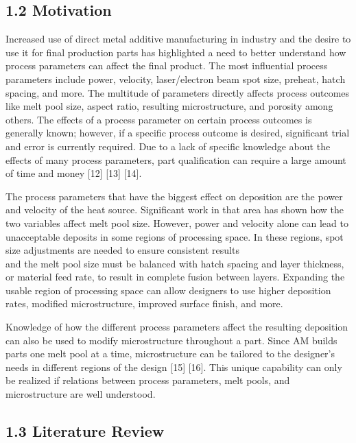 \documentclass[10pt]{article}
\begin{document}
\subsection*{1.2 Motivation}
Increased use of direct metal additive manufacturing in industry and the desire to use it for final production parts has highlighted a need to better understand how process parameters can affect the final product. The most influential process parameters include power, velocity, laser/electron beam spot size, preheat, hatch spacing, and more. The multitude of parameters directly affects process outcomes like melt pool size, aspect ratio, resulting microstructure, and porosity among others. The effects of a process parameter on certain process outcomes is generally known; however, if a specific process outcome is desired, significant trial and error is currently required. Due to a lack of specific knowledge about the effects of many process parameters, part qualification can require a large amount of time and money [12] [13] [14].

The process parameters that have the biggest effect on deposition are the power and velocity of the heat source. Significant work in that area has shown how the two variables affect melt pool size. However, power and velocity alone can lead to unacceptable deposits in some regions of processing space. In these regions, spot size adjustments are needed to ensure consistent results\\
and the melt pool size must be balanced with hatch spacing and layer thickness, or material feed rate, to result in complete fusion between layers. Expanding the usable region of processing space can allow designers to use higher deposition rates, modified microstructure, improved surface finish, and more.

Knowledge of how the different process parameters affect the resulting deposition can also be used to modify microstructure throughout a part. Since AM builds parts one melt pool at a time, microstructure can be tailored to the designer's needs in different regions of the design [15] [16]. This unique capability can only be realized if relations between process parameters, melt pools, and microstructure are well understood.

\subsection*{1.3 Literature Review}
\end{document}
